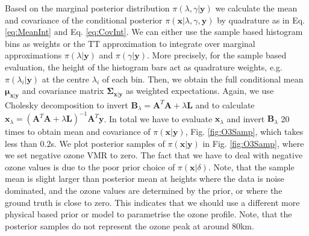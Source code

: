Based on the marginal posterior distribution $\pi(\lambda, \gamma| \bm{y})$ we calculate the mean and covariance of the conditional posterior $\pi(\bm{x} |\lambda, \gamma, \bm{y})$ by quadrature as in Eq. \ref{eq:MeanInt} and Eq. \ref{eq:CovInt}.
We can either use the sample based histogram bins as weights or the TT approximation to integrate over marginal approximations $\pi(\lambda| \bm{y})$ and $\pi( \gamma | \bm{y})$.
More precisely, for the sample based evaluation, the height of the histogram bars act as quadrature weights, e.g. $\pi(\lambda_i| \bm{y})$ at the centre $\lambda_i$ of each bin.
Then, we obtain the full conditional mean $\bm{\mu}_{\bm{x}|\bm{y}}$ and covariance matrix $\bm{\Sigma}_{\bm{x}|\bm{y}}$ as weighted expectations.
Again, we use Cholesky decomposition to invert $\bm{B}_{\lambda} = \bm{A}^T \bm{A} + \lambda \bm{L}$ and to calculate $\bm{x}_{\lambda} = (\bm{A}^T \bm{A} + \lambda \bm{L} )^{-1} \bm{A}^T \bm{y}$.
In total we have to evaluate $\bm{x}_{\lambda}$ and invert $\bm{B}_{\lambda}$ 20 times to obtain mean and covariance of $\pi(\bm{x}|\bm{y})$, Fig. \ref{fig:O3Samp}, which takes less than $0.2$s.
We plot posterior samples of $\pi(\bm{x}|\bm{y})$ in Fig. \ref{fig:O3Samp}, where we set negative ozone VMR to zero.
The fact that we have to deal with negative ozone values is due to the poor prior choice of $\pi(\bm{x}|\delta)$.
Note, that the sample mean is slight larger than posterior mean at heights where the data is noise dominated, and the ozone values are determined by the prior, or where the ground truth is close to zero.
This indicates that we should use a different more physical based prior or model to parametrise the ozone profile.
Note, that the posterior samples do not represent the ozone peak at around $80$km.
